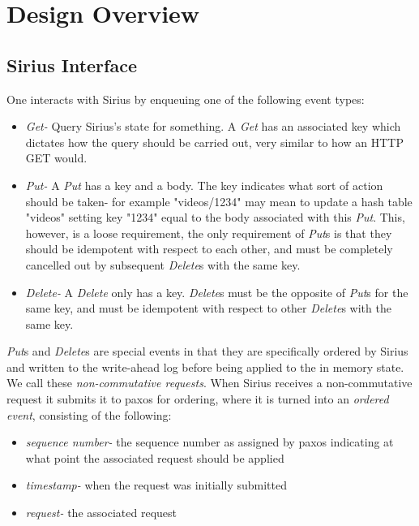 \documentclass[11pt]{article}
\begin{document}
\section{Design Overview}

\subsection{Sirius Interface}
One interacts with Sirius by enqueuing one of the following event types:

\begin{itemize}
\item {\em Get-}
    Query Sirius's state for something.  A {\em Get} has an associated key
    which dictates how the query should be carried out, very similar to how
    an HTTP GET would.
\item {\em Put-}
    A {\em Put} has a key and a body.  The key indicates what sort of action
    should be taken- for example "videos/1234" may mean to update a hash
    table "videos" setting key "1234" equal to the body associated with
    this {\em Put}.  This, however, is a loose requirement, the only requirement
    of {\em Put}s is that they should be idempotent with respect to each other,
    and must be completely cancelled out by subsequent {\em Delete}s with the
    same key.
\item {\em Delete-}
    A {\em Delete} only has a key. {\em Delete}s must be
    the opposite of {\em Put}s for the same key, and must be idempotent with
    respect to other {\em Delete}s with the same key.
\end{itemize}

{\em Put}s and {\em Delete}s are special events in that they are specifically
ordered by Sirius and written to the write-ahead log before being applied to
the in memory state. We call these {\em non-commutative requests}. When Sirius
receives a non-commutative request it submits it to paxos for ordering, where
it is turned into an {\em ordered event}, consisting of the following:

\begin{itemize}
\item {\em sequence number-}
    the sequence number as assigned by paxos indicating at what point the
    associated request should be applied
\item {\em timestamp-}
    when the request was initially submitted
\item {\em request-}
    the associated request
\end{itemize}
\end{document}
